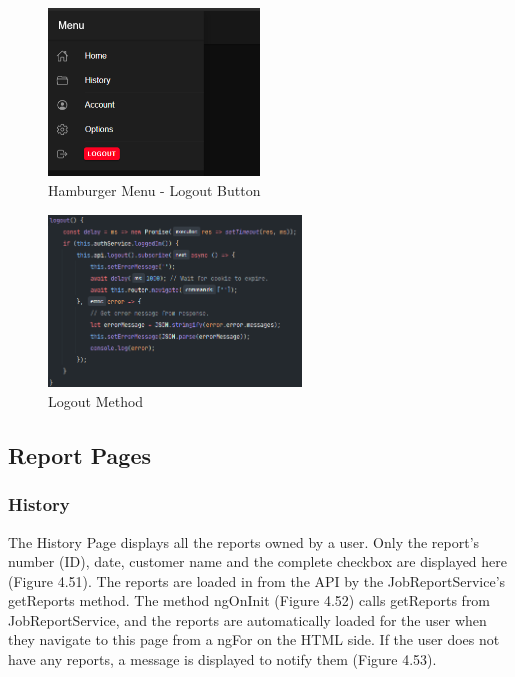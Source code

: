 \begin{figure}[H]
    \caption{Hamburger Menu - Logout Button}
    \label{image:logoutButton}
    \centering
    \includegraphics[width=0.5\textwidth]{images/repota/UI/logout.png}
\end{figure}

\begin{figure}[H]
    \caption{Logout Method}
    \label{image:logoutMethod}
    \centering
    \includegraphics[width=0.6\textwidth]{images/repota/account_pages/logout_method.png}
\end{figure}

\subsection{Report Pages}

\subsubsection{History}
The History Page displays all the reports owned by a user. Only the report's number (ID), date, customer name and the complete checkbox are displayed here (Figure 4.51). The reports are loaded in from the API by the JobReportService's getReports method. The method ngOnInit (Figure 4.52) calls getReports from JobReportService, and the reports are automatically loaded for the user when they navigate to this page from a ngFor on the HTML side. If the user does not have any reports, a message is displayed to notify them (Figure 4.53). 

